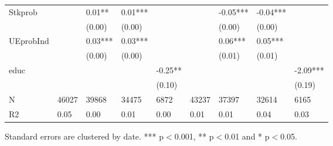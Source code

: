 \begin{table}[ht]
\begin{adjustbox}{width={15cm},totalheight={20cm}}
\begin{threeparttable}
\begin{tabular}{lllllllll}
Stkprob            &           &     0.01** &     0.01*** &              &            &    -0.05*** &     -0.04*** &               \\
                   &           &     (0.00) &      (0.00) &              &            &      (0.00) &       (0.00) &               \\
UEprobInd          &           &    0.03*** &     0.03*** &              &            &     0.06*** &      0.05*** &               \\
                   &           &     (0.00) &      (0.00) &              &            &      (0.01) &       (0.01) &               \\
educ               &           &            &             &      -0.25** &            &             &              &      -2.09*** \\
                   &           &            &             &       (0.10) &            &             &              &        (0.19) \\
N                  &     46027 &      39868 &       34475 &         6872 &      43237 &       37397 &        32614 &          6165 \\
R2                 &      0.05 &       0.00 &        0.01 &         0.00 &       0.01 &        0.01 &         0.04 &          0.03 \\
\bottomrule
\end{tabular}
\begin{tablenotes}\item Standard errors are clustered by date. *** p$<$0.001, ** p$<$0.01 and * p$<$0.05. 
\end{tablenotes}
\end{threeparttable}
\end{adjustbox}
\end{table}